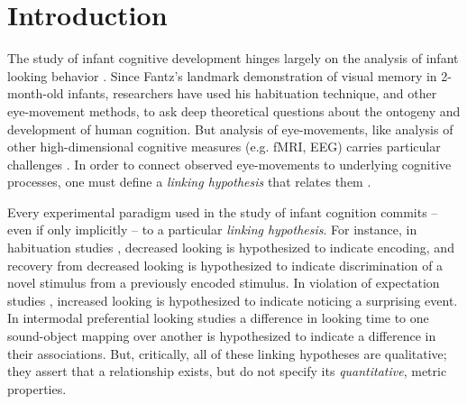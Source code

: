 \documentclass[12pt]{article}
\begin{document}
\section*{Introduction}

The study of infant cognitive development hinges largely on the analysis of infant looking behavior \cite{Aslin2007}. Since Fantz’s \cite{Fantz1964} landmark demonstration of visual memory in 2-month-old infants, researchers have used his habituation technique, and other eye-movement methods, to ask deep theoretical questions about the ontogeny and development of human cognition. But analysis of eye-movements, like analysis of other high-dimensional cognitive measures (e.g. fMRI, EEG) carries particular challenges \cite{Yu2012}. In order to connect observed eye-movements to underlying cognitive processes, one must define a \emph{linking hypothesis} that relates them \cite{Aslin2007, Teller1984}. 
	
	Every experimental paradigm used in the study of infant cognition commits -- even if only implicitly -- to a particular \emph{linking hypothesis}. For instance, in habituation studies \cite{Fantz1964, Stager1997}, decreased looking is hypothesized to indicate encoding, and recovery from decreased looking is hypothesized to indicate discrimination of a novel stimulus from a previously encoded stimulus. In violation of expectation studies \cite{Baillargeon1986, Kobayashi2005}, increased looking is hypothesized to indicate noticing a surprising event. In intermodal preferential looking studies \cite{Golinkoff1987, Smith2008} a difference in looking time to one sound-object mapping over another is hypothesized to indicate a difference in their associations. But, critically, all of these linking hypotheses are qualitative; they assert that a relationship exists, but do not specify its \emph{quantitative}, metric properties.
	
\end{document}
